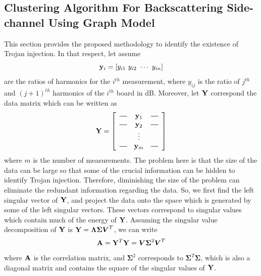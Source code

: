 \documentclass[journal]{IEEEtran}
\newcommand*{\horzbar}{\rule[.5ex]{2.5ex}{0.5pt}}
\begin{document}
\subsection{Clustering Algorithm For Backscattering Side-channel Using Graph Model}
This section provides the proposed methodology to identify the existence of Trojan injection. In that respect, let assume 
$$ {\bf y}_i = \left[  y_{i1} ~  y_{i2} ~ \cdots ~  y_{in} \right]$$
are the ratios of harmonics for the $i^{th}$ measurement, where $ y_{ij}$ is the ratio of $j^{th}$ and $(j + 1)^{th}$ harmonics of the $i^{th}$ board in dB. Moreover, let ${\bf Y}$ correspond the data matrix which can be written as
\begin{eqnarray}
{\bf Y} =  \left[\begin{array}{ccc}
\horzbar & {\bf y}_1 & \horzbar \\
\horzbar & {\bf y}_2 & \horzbar \\
&\vdots& \\
\horzbar & {\bf y}_m & \horzbar \\
\end{array}\right]
\end{eqnarray}
where $m$ is the number of measurements. The problem here  is that the size of the data can be large so that some of the crucial information can be hidden to identify Trojan injection. Therefore,
diminishing the size of the problem can eliminate the redundant information regarding the data. So, we first find the left singular vector of ${\bf Y} $, and project the data onto the space which is generated by some of the left singular vectors. These vectors correspond to singular values which contain  much of the energy of ${\bf Y}$. Assuming the singular value decomposition of  ${\bf Y}$ is ${\bf Y} = {\boldsymbol \Lambda \boldsymbol\Sigma  \boldsymbol V}^T$, we can write 
$${\bf A} = {\bf Y}^T{\bf Y} = \boldsymbol V \boldsymbol\Sigma^2 \boldsymbol V^T $$
where  ${\bf A} $ is the correlation matrix, and $\boldsymbol\Sigma^2$ corresponds to $\boldsymbol\Sigma^T\boldsymbol\Sigma$, which is also a diagonal matrix and contains the square of the singular values of ${\bf Y}$. 
\end{document}

